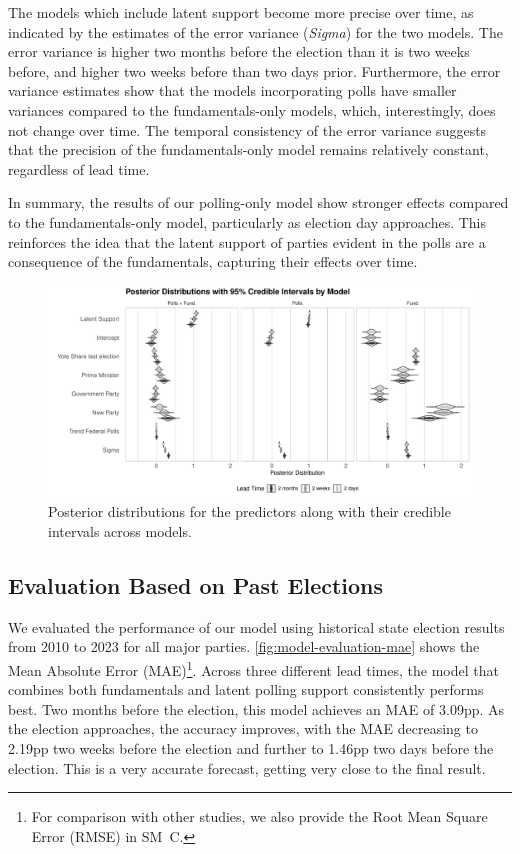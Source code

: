 \documentclass[doublespaced,12pt]{article}
\begin{document}
\begin{doublespacing}
The models which include latent support become more precise over time, as indicated by the estimates of the error variance (\textit{Sigma}) for the two models. The error variance is higher two months before the election than it is two weeks before, and higher two weeks before than two days prior. Furthermore, the error variance estimates show that the models incorporating polls have smaller variances compared to the fundamentals-only models, which, interestingly, does not change over time. The temporal consistency of the error variance suggests that the precision of the fundamentals-only model remains relatively constant, regardless of lead time.

In summary, the results of our polling-only model show stronger effects compared to the fundamentals-only model, particularly as election day approaches. This reinforces the idea that the latent support of parties evident in the polls are a consequence of the fundamentals, capturing their effects over time.


\begin{figure}[!t]
    \centering
    \includegraphics[width=\textwidth]{fg3_fig_eval_bayes_par.pdf}  
    \caption{Posterior distributions for the predictors along with their credible intervals across models.}
    \label{fig:fundamental-estimates}
\end{figure}

\FloatBarrier
\subsection{Evaluation Based on Past Elections}
\FloatBarrier


We evaluated the performance of our model using historical state election results from 2010 to 2023 for all major parties. \autoref{fig:model-evaluation-mae} shows the Mean Absolute Error (MAE)\footnote{For comparison with other studies, we also provide the Root Mean Square Error (RMSE) in SM~C.}. Across three different lead times, the model that combines both fundamentals and latent polling support consistently performs best. Two months before the election, this model achieves an MAE of 3.09pp. As the election approaches, the accuracy improves, with the MAE decreasing to 2.19pp two weeks before the election and further to 1.46pp two days before the election. This is a very accurate forecast, getting very close to the final result.


\end{doublespacing}
\end{document}
